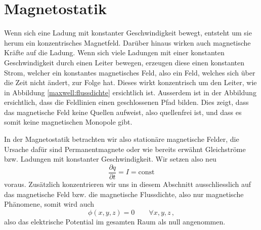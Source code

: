 %
%
%
%
\section{Magnetostatik\label{maxwell:magnetostatik}}


Wenn sich eine Ladung mit konstanter Geschwindigkeit bewegt, entsteht um sie herum ein konzentrisches Magnetfeld. Darüber hinaus wirken auch magnetische Kräfte auf die Ladung.
Wenn sich viele Ladungen mit einer konstanten Geschwindigkeit durch einen Leiter bewegen, erzeugen diese einen konstanten Strom, welcher ein konstantes magnetisches Feld, also ein Feld, welches sich über die Zeit nicht ändert, zur Folge hat. Dieses wirkt konzentrisch um den Leiter, wie in Abbildung \ref{maxwell:flussdichte} ersichtlich ist. Ausserdem ist in der Abbildung ersichtlich, dass die Feldlinien einen geschlossenen Pfad bilden. Dies zeigt, dass das magnetische Feld keine Quellen aufweist, also quellenfrei ist, und dass es somit keine magnetischen Monopole gibt.

In der Magnetostatik betrachten wir also stationäre magnetische Felder, die Ursache dafür sind Permanentmagnete oder wie bereits erwähnt Gleichströme bzw. Ladungen mit konstanter Geschwindigkeit.
Wir setzen also neu
\[ 
\frac{\partial q}{\partial t}
=
I
=
\text{const}
\]
voraus.
Zusätzlich konzentrieren wir uns in diesem Abschnitt ausschliesslich auf das magnetische Feld bzw. die magnetische Flussdichte, also nur magnetische Phänomene, somit wird auch
\[\phi(x,y,z) = 0 \qquad \forall x,y,z\, ,\] 
also das elektrische Potential im gesamten Raum als null angenommen. 



